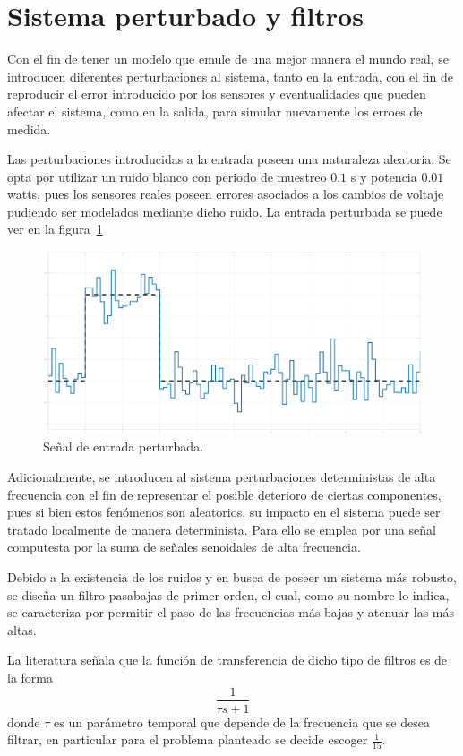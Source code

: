 \section{Sistema perturbado y filtros}
Con el fin de tener un modelo que emule de una mejor manera el mundo real,
se introducen diferentes perturbaciones al sistema, tanto en la
entrada, con el fin de reproducir el error introducido por los sensores
y eventualidades que pueden afectar el sistema, como en la salida, para simular nuevamente los erroes de medida.

Las perturbaciones introducidas a la entrada poseen una naturaleza aleatoria. Se opta por utilizar un ruido blanco con periodo de
muestreo $0.1$ s y potencia $0.01$ watts, pues los sensores reales poseen errores
asociados a los cambios de voltaje pudiendo ser modelados mediante dicho ruido.
La entrada perturbada se puede ver en la figura~\ref{fig:entrada-ruido}

\begin{figure}[t]
  \label{fig:entrada-ruido}
  \includegraphics[scale=0.15]{Figuras/entrada}
  \caption{Señal de entrada perturbada.} 
\end{figure}

Adicionalmente, se introducen al sistema perturbaciones deterministas
de alta frecuencia con el fin de representar el posible deterioro de ciertas
componentes, pues si bien estos fenómenos son aleatorios, su impacto en el sistema
puede ser tratado localmente de manera determinista. Para ello se emplea por una señal computesta por la suma de señales senoidales de alta frecuencia.

Debido a la existencia de los ruidos y en busca de poseer un sistema más robusto, se diseña un filtro pasabajas de primer orden,
el cual, como su nombre lo indica, se caracteriza por permitir el paso de las frecuencias
más bajas y atenuar las más altas.

La literatura señala que la función de transferencia de dicho tipo de filtros
es de la forma
\[
\frac{1}{\tau s + 1}
\]
donde $\tau $ es un parámetro temporal que depende de la frecuencia que se desea
filtrar, en particular para el problema planteado se decide escoger $\frac{1}{15}$.

